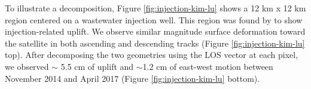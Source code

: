 To illustrate a decomposition, Figure \ref{fig:injection-kim-lu} shows a 12 km x 12 km region centered on a wastewater injection well. This region was found by \cite{Kim2018AssociationLocalizedGeohazards} to show injection-related uplift. We observe similar magnitude surface deformation toward the satellite in both ascending and descending tracks (Figure \ref{fig:injection-kim-lu} top). After decomposing the two geometries using the LOS vector at each pixel, we observed $\sim$ 5.5 cm of uplift and $\sim$1.2 cm of east-west motion between November 2014 and April 2017 (Figure \ref{fig:injection-kim-lu} bottom). 




